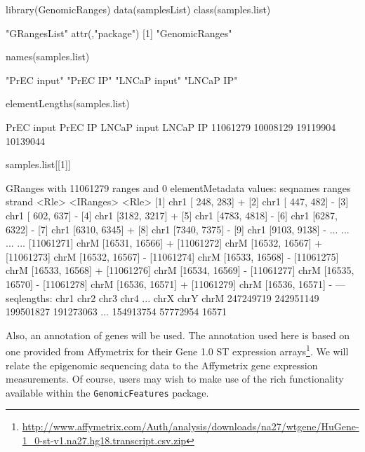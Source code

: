\begin{Schunk}
\begin{Sinput}
 library(GenomicRanges)
 data(samplesList)
 class(samples.list)
\end{Sinput}
\begin{Soutput}
[1] "GRangesList"
attr(,"package")
[1] "GenomicRanges"
\end{Soutput}
\begin{Sinput}
 names(samples.list)
\end{Sinput}
\begin{Soutput}
[1] "PrEC input"  "PrEC IP"     "LNCaP input" "LNCaP IP"   
\end{Soutput}
\begin{Sinput}
 elementLengths(samples.list)
\end{Sinput}
\begin{Soutput}
 PrEC input     PrEC IP LNCaP input    LNCaP IP 
   11061279    10008129    19119904    10139044 
\end{Soutput}
\begin{Sinput}
 samples.list[[1]]
\end{Sinput}
\begin{Soutput}
GRanges with 11061279 ranges and 0 elementMetadata values:
             seqnames         ranges strand
                <Rle>      <IRanges>  <Rle>
         [1]     chr1   [ 248,  283]      +
         [2]     chr1   [ 447,  482]      -
         [3]     chr1   [ 602,  637]      -
         [4]     chr1   [3182, 3217]      +
         [5]     chr1   [4783, 4818]      -
         [6]     chr1   [6287, 6322]      -
         [7]     chr1   [6310, 6345]      +
         [8]     chr1   [7340, 7375]      -
         [9]     chr1   [9103, 9138]      -
         ...      ...            ...    ...
  [11061271]     chrM [16531, 16566]      +
  [11061272]     chrM [16532, 16567]      +
  [11061273]     chrM [16532, 16567]      -
  [11061274]     chrM [16533, 16568]      -
  [11061275]     chrM [16533, 16568]      +
  [11061276]     chrM [16534, 16569]      -
  [11061277]     chrM [16535, 16570]      -
  [11061278]     chrM [16536, 16571]      +
  [11061279]     chrM [16536, 16571]      -
  ---
  seqlengths:
        chr1      chr2      chr3      chr4 ...      chrX      chrY      chrM
   247249719 242951149 199501827 191273063 ... 154913754  57772954     16571
\end{Soutput}
\end{Schunk}

Also, an annotation of genes will be used. The annotation used here is based on one provided from Affymetrix for their Gene 1.0 ST expression arrays\footnote{\href{http://www.affymetrix.com/Auth/analysis/downloads/na27/wtgene/HuGene-1\_0-st-v1.na27.hg18.transcript.csv.zip}{http://www.affymetrix.com/Auth/analysis/downloads/na27/wtgene/HuGene-1\_0-st-v1.na27.hg18.transcript.csv.zip}}. We will relate the epigenomic sequencing data to the Affymetrix gene expression measurements.  Of course, users may wish to make use of the rich functionality available within the \texttt{GenomicFeatures} package.
 
